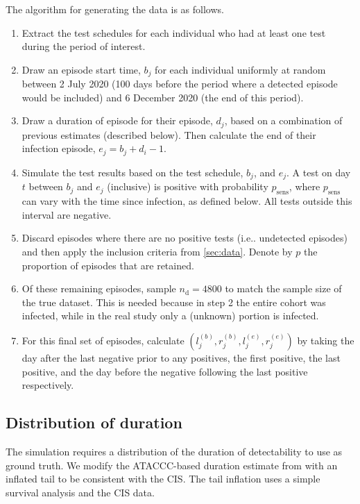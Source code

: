 \documentclass{article}
\makeatletter
\newcommand{\psens}{p_\text{sens}}
\newcommand{\ndet}{n_\text{d}}
\DeclareRobustCommand\onedot{\futurelet\@let@token\@onedot}
\def\@onedot{\ifx\@let@token.\else.\null\fi\xspace}
\def\ie{i.e\onedot} \def\Ie{{I.e}\onedot}
\makeatother
\begin{document}
The algorithm for generating the data is as follows.

\begin{enumerate}
    \item Extract the test schedules for each individual who had at least one test during the period of interest.
    \item Draw an episode start time, $b_{j}$ for each individual uniformly at random between 2 July 2020 (100 days before the period where a detected episode would be included) and 6 December 2020 (the end of this period).
    \item Draw a duration of episode for their episode, $d_j$, based on a combination of previous estimates (described below). Then calculate the end of their infection episode, $e_{j} = b_{j} + d_i - 1$.
    \item Simulate the test results based on the test schedule, $b_{j}$, and $e_{j}$. A test on day $t$ between $b_{j}$ and $e_{j}$ (inclusive) is positive with probability $\psens$, where $\psens$ can vary with the time since infection, as defined below. All tests outside this interval are negative.
    \item Discard episodes where there are no positive tests (\ie undetected episodes) and then apply the inclusion criteria from \cref{sec:data}. Denote by $p$ the proportion of episodes that are retained.
    \item Of these remaining episodes, sample $\ndet = 4800$ to match the sample size of the true dataset. This is needed because in step 2 the entire cohort was infected, while in the real study only a (unknown) portion is infected.
    \item For this final set of episodes, calculate $(l_j^{(b)}, r_j^{(b)}, l_j^{(e)}, r_j^{(e)})$ by taking the day after the last negative prior to any positives, the first positive, the last positive, and the day before the negative following the last positive respectively.
\end{enumerate}

\subsection{Distribution of duration} \label{sec:simulation-truth}

The simulation requires a distribution of the duration of detectability to use as ground truth.
We modify the ATACCC-based duration estimate from \citet[chapter 4]{blakeThesis} with an inflated tail to be consistent with the CIS.
The tail inflation uses a simple survival analysis and the CIS data.
\end{document}
